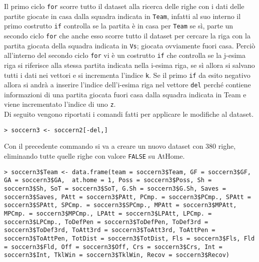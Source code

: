 Il primo ciclo \texttt{for} scorre tutto il dataset alla ricerca delle righe con i dati delle partite giocate in casa dalla squadra indicata in \texttt{Team}, infatti al suo interno il primo costrutto \texttt{if} controlla se la partita è in casa per \texttt{Team} se sì, parte un secondo ciclo \texttt{for} che anche esso scorre tutto il dataset per cercare la riga con la partita giocata della squadra indicata in \texttt{Vs}; giocata ovviamente fuori casa. Perciò all'interno del secondo ciclo \texttt{for} vi è un costrutto \texttt{if} che controlla se la j-esima riga si riferisce alla stessa partita indicata nella i-esima riga, se sì allora si salvano tutti i dati nei vettori e si incrementa l'indice \texttt{k}. Se il primo \texttt{if} da esito negativo allora si andrà a inserire l'indice dell'i-esima riga nel vettore \texttt{del} perché contiene informazioni di una partita giocata fuori casa dalla squadra indicata in \textsf{Team} e viene incrementato l'indice di uno \texttt{z}.\\

Di seguito vengono riportati i comandi fatti per applicare le modifiche al dataset.
\bigskip
\begin{lstlisting}
> soccern3 <- soccern2[-del,]
\end{lstlisting}
\bigskip
Con il precedente commando si va a creare un nuovo dataset con 380 righe, eliminando tutte quelle righe con valore \texttt{FALSE} su \textsf{AtHome}. 
\bigskip
\begin{lstlisting}
> soccern3$Team <- data.frame(team = soccern3$Team, GF = soccern3$GF, GA = soccern3$GA,  at.home = 1, Poss = soccern3$Poss, Sh = soccern3$Sh, SoT = soccern3$SoT, G.Sh = soccern3$G.Sh, Saves = soccern3$Saves, PAtt = soccern3$PAtt, PCmp. = soccern3$PCmp., SPAtt = soccern3$SPAtt, SPCmp. = soccern3$SPCmp., MPAtt = soccern3$MPAtt, MPCmp. = soccern3$MPCmp., LPAtt = soccern3$LPAtt, LPCmp. = soccern3$LPCmp., ToDefPen = soccern3$ToDefPen, ToDef3rd = soccern3$ToDef3rd, ToAtt3rd = soccern3$ToAtt3rd, ToAttPen = soccern3$ToAttPen, TotDist = soccern3$TotDist, Fls = soccern3$Fls, Fld = soccern3$Fld, Off = soccern3$Off, Crs = soccern3$Crs, Int = soccern3$Int, TklWin = soccern3$TklWin, Recov = soccern3$Recov)

\end{lstlisting}

